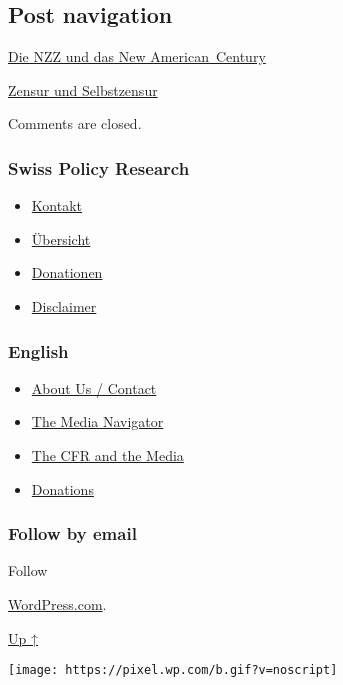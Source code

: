 \hypertarget{post-navigation}{%
\subsection{Post navigation}\label{post-navigation}}

\href{https://swprs.org/2017/03/01/nzz-new-american-century/}{Die NZZ
und das New American~Century}

\href{https://swprs.org/2017/03/01/zensur-in-schweizer-medien/}{Zensur
und Selbstzensur}

Comments are closed.

\hypertarget{swiss-policy-research}{%
\subsubsection{Swiss Policy Research}\label{swiss-policy-research}}

\begin{itemize}
\tightlist
\item
  \href{https://swprs.org/kontakt/}{Kontakt}
\item
  \href{https://swprs.org/uebersicht/}{Übersicht}
\item
  \href{https://swprs.org/donationen/}{Donationen}
\item
  \href{https://swprs.org/disclaimer/}{Disclaimer}
\end{itemize}

\hypertarget{english}{%
\subsubsection{English}\label{english}}

\begin{itemize}
\tightlist
\item
  \href{https://swprs.org/contact/}{About Us / Contact}
\item
  \href{https://swprs.org/media-navigator/}{The Media Navigator}
\item
  \href{https://swprs.org/the-american-empire-and-its-media/}{The CFR
  and the Media}
\item
  \href{https://swprs.org/donations/}{Donations}
\end{itemize}

\hypertarget{follow-by-email}{%
\subsubsection{Follow by email}\label{follow-by-email}}

Follow

\href{https://wordpress.com/?ref=footer_custom_com}{WordPress.com}.

\protect\hyperlink{}{Up ↑}

\texttt{[image: https://pixel.wp.com/b.gif?v=noscript]}
